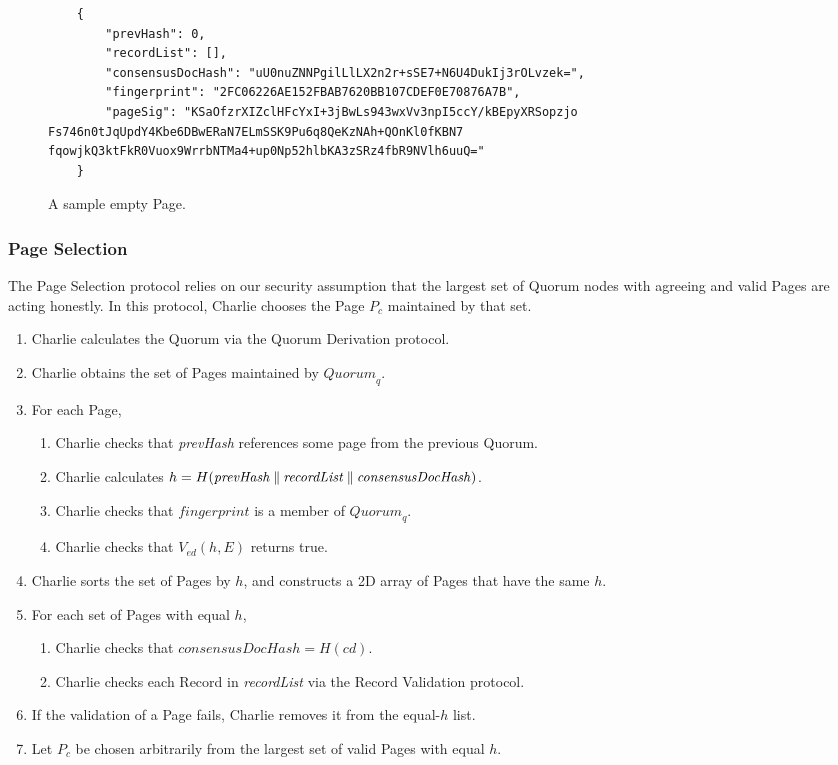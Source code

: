 \begin{figure}
	\begin{lstlisting}
	{
		"prevHash": 0,
		"recordList": [],
		"consensusDocHash": "uU0nuZNNPgilLlLX2n2r+sSE7+N6U4DukIj3rOLvzek=",
		"fingerprint": "2FC06226AE152FBAB7620BB107CDEF0E70876A7B",
		"pageSig": "KSaOfzrXIZclHFcYxI+3jBwLs943wxVv3npI5ccY/kBEpyXRSopzjo Fs746n0tJqUpdY4Kbe6DBwERaN7ELmSSK9Pu6q8QeKzNAh+QOnKl0fKBN7 fqowjkQ3ktFkR0Vuox9WrrbNTMa4+up0Np52hlbKA3zSRz4fbR9NVlh6uuQ="
	}
	\end{lstlisting}
	\caption{A sample empty Page.}
	\label{fig:emptyPage}
\end{figure}

\subsubsection{Page Selection}

The Page Selection protocol relies on our security assumption that the largest set of Quorum nodes with agreeing and valid Pages are acting honestly. In this protocol, Charlie chooses the Page $ P_{c} $ maintained by that set.

\begin{enumerate}
	\item Charlie calculates the Quorum via the Quorum Derivation protocol.
	\item Charlie obtains the set of Pages maintained by $ \mathit{Quorum}_{q} $.
	\item For each Page,
		\begin{enumerate}
			\item Charlie checks that \emph{prevHash} references some page from the previous Quorum.
			\item Charlie calculates $ h = H(\mathit{prevHash} \mathbin{\|} \mathit{recordList} \mathbin{\|} \mathit{consensusDocHash}) $.
			\item Charlie checks that $ \mathit{fingerprint} $ is a member of $ \mathit{Quorum}_{q} $.
			\item Charlie checks that $ V_{\mathit{ed}}(h, E) $ returns true.
		\end{enumerate}
	\item Charlie sorts the set of Pages by $ h $, and constructs a 2D array of Pages that have the same $ h $.
	\item For each set of Pages with equal $ h $,
		\begin{enumerate}
			\item Charlie checks that $ \mathit{consensusDocHash} = H(\mathit{cd}) $.
			\item Charlie checks each Record in \emph{recordList} via the Record Validation protocol.
		\end{enumerate}
	\item If the validation of a Page fails, Charlie removes it from the equal-$ h $ list.
	\item Let $ P_{c} $ be chosen arbitrarily from the largest set of valid Pages with equal $ h $.
\end{enumerate}

